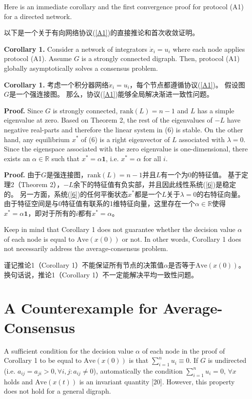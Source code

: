 \documentclass{article}
\begin{document}
{\color[gray]{0.5}
Here is an immediate corollary and the ﬁrst convergence proof for protocol (A1) for a directed network.
}

以下是一个关于有向网络协议(\ref{A1})的直接推论和首次收敛证明。

{\color[gray]{0.5}
\noindent \textbf{Corollary 1.} Consider a network of integrators $\dot{x}_i = u_i$ where each node applies protocol (A1). 
Assume $G$ is a strongly connected digraph. 
Then, protocol (A1) globally asymptotically solves a consensus problem.
}

\noindent \textbf{Corollary 1.} 考虑一个积分器网络$\dot{x}_i = u_i$，每个节点都遵循协议(\ref{A1})。
假设图$G$是一个强连接图。
那么，协议(\ref{A1})能够全局解决渐进一致性问题。

{\color[gray]{0.5}
\noindent \textbf{Proof.} Since $G$ is strongly connected, $\text{rank}(L)=n-1$ and $L$ has a simple eigenvalue at zero. 
Based on Theorem 2, the rest of the eigenvalues of $−L$ have negative real-parts and therefore the linear system in (6) is stable. 
On the other hand, any equilibrium $x^*$ of (6) is a right eigenvector of $L$ associated with $\lambda=0$. 
Since the eigenspace associated with the zero eigenvalue is one-dimensional, there exists an $\alpha\in \mathbb{R}$ such that $x^*=\alpha\mathbf{1}$, i.e. $x^*=\alpha$ for all $i$.
}

\noindent \textbf{Proof.} 由于$G$是强连接图，$\text{rank}(L)=n-1$并且$L$有一个为0的特征值。
基于定理2（Theorem 2），$-L$余下的特征值有负实部，并且因此线性系统(\ref{6})是稳定的。
另一方面，系统(\ref{6})的任何平衡状态$x^*$都是一个$L$关于$\lambda=0$的右特征向量。
由于特征空间是与0特征值有联系的1维特征向量，这里存在一个$\alpha\in \mathbb{R}$使得$x^*=\alpha\mathbf{1}$，即对于所有的$i$都有$x^*=\alpha$。

{\color[gray]{0.5}
Keep in mind that Corollary 1 does not guarantee whether the decision value $\alpha$ of each node is equal to $\text{Ave}(x(0))$ or not. 
In other words, Corollary 1 does not necessarily address the average-consensus problem.
}

谨记推论1（Corollary 1）不能保证所有节点的决策值$\alpha$是否等于$\text{Ave}(x(0))$。
换句话说，推论1（Corollary 1）不一定能解决平均一致性问题。

\section{A Counterexample for Average-Consensus}
{\color[gray]{0.5}
\noindent A suﬃcient condition for the decision value $\alpha$ of each node in the proof of Corollary 1 to be equal to $\text{Ave}(x(0))$ is that $\sum_{i=1}^{n}u_i \equiv 0$. 
If $G$ is undirected (i.e. $a_{ij}=a_{ji} > 0,\forall i,j: a_{ij}\ne 0$), automatically the condition $\sum_{i=1}^{n}u_i=0$, $\forall x$ holds and $\text{Ave}(x(t))$ is an invariant quantity [20]. 
However, this property does not hold for a general digraph.
}
\end{document}
